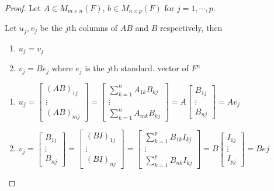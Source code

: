\begin{proof}
	Let $A \in M_{m\times n}(F)$, $b \in M_{n\times p }(F)$ for $j = 1,\cdots , p$.

Let $u_j , v_j$ be the $j$th columns of $AB$ and $B$ respectively, then 
\begin{enumerate}
\item $u_j = v_j$
\item $v_j = Be_j$ where $e_j$ is the $j$th standard. vector of $F^{n}$  
\end{enumerate}

\begin{enumerate}
\item $u_j = \begin{bmatrix}
	(AB)_{1j} \\ \vdots \\(AB)_{mj}
\end{bmatrix} = \begin{bmatrix}
	\sum_{k=1}^n A_{1k}B_{kj} \\ \vdots \\\sum_{k=1}^n A_{mk}B_{kj} 
\end{bmatrix} = A\begin{bmatrix}
	B_{1j}\\ \vdots \\ B_{nj}
\end{bmatrix} = Av_{j}$

\item $v_j = \begin{bmatrix}
B_{1j} \\ \vdots \\ B_{nj}
\end{bmatrix} = \begin{bmatrix}
	(BI)_{1j} \\ \vdots \\ (BI)_{nj}
\end{bmatrix} = \begin{bmatrix}
	\sum_{k=1}^p B_{1k}I_{kj}\\ \vdots \\ \sum_{k=1}^{p}B_{nk}I_{kj}
\end{bmatrix} = B\begin{bmatrix}
	I_{1j}\\ \vdots\\ I_{pj}
\end{bmatrix} = Bej$
\end{enumerate}
\end{proof}

